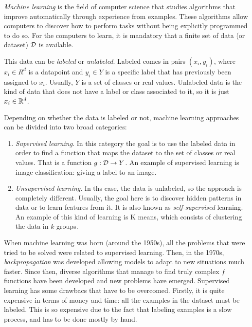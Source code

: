 \label{Chapter:Intro:Rep:Learning}

\emph{Machine learning} is the field of computer science that studies algorithms that improve automatically through experience from examples. 
These algorithms allow computers to discover how to
perform tasks without being explicitly programmed to do so. For the computers to learn, it is mandatory that a finite set of data (or dataset) $\mathcal{D}$ is available. 

This data can be \emph{labeled} or \emph{unlabeled}. Labeled comes in pairs $(x_i,y_i)$, where $x_i \in R^d$ is a datapoint and $y_i \in Y$ is a specific label that has previously been assigned to $x_i$. Usually, $Y$ is a set of classes or real values.
Unlabeled data is the kind of data that does not have a label or class associated to it, so it is just $x_i \in \mathbb{R}^d$. 

Depending on whether the data is labeled or not, machine learning approaches can be divided into two broad categories:
\begin{enumerate}
    \item \emph{Supervised learning}. In this category the goal is to use the labeled data in order to find a function that maps the dataset to the set of classes or real values. That is a function $g:\mathcal{D} \to Y$. 
    An example of supervised learning is image classification: giving a label to an image.
    \item \emph{Unsupervised learning}. In ths case, the data is unlabeled, so the approach is completely different. Usually, the goal here is to discover hidden patterns in data or to learn features from it. It is also known as \emph{self-supervised} learning.
    An example of this kind of learning is K means, which consists of clustering the data in $k$ groups. 

\end{enumerate}

When machine learning was born (around the 1950s), all the problems that were tried to be solved were related to supervised learning. Then, in the 1970s, \emph{backpropagation} was developed allowing models to adapt to new situations much faster. Since then, diverse algorithms that manage to find truly complex $f$ functions have been developed and new problems have emerged. Supervised learning has some drawbacs that have to be overcomed. Firstly, it is quite expensive in terms of money and time: all the examples in the dataset must be labeled. This is so expensive due to the fact that labeling examples is a slow process, and has to be done mostly by hand. 

